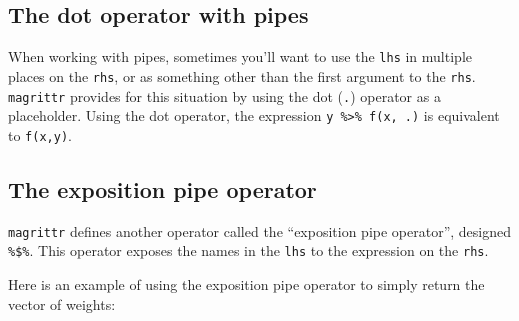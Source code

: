 \documentclass[]{book}
\newenvironment{Shaded}{\begin{snugshade}}{\end{snugshade}}
\newcommand{\CommentTok}[1]{\textcolor[rgb]{0.56,0.35,0.01}{\textit{#1}}}
\newcommand{\DecValTok}[1]{\textcolor[rgb]{0.00,0.00,0.81}{#1}}
\newcommand{\KeywordTok}[1]{\textcolor[rgb]{0.13,0.29,0.53}{\textbf{#1}}}
\newcommand{\NormalTok}[1]{#1}
\newcommand{\OperatorTok}[1]{\textcolor[rgb]{0.81,0.36,0.00}{\textbf{#1}}}
\newcommand{\StringTok}[1]{\textcolor[rgb]{0.31,0.60,0.02}{#1}}
\theoremstyle{definition}
\theoremstyle{definition}
\theoremstyle{definition}
\theoremstyle{remark}
\begin{document}
\hypertarget{the-dot-operator-with-pipes}{%
\subsection{The dot operator with
pipes}\label{the-dot-operator-with-pipes}}

When working with pipes, sometimes you'll want to use the \texttt{lhs}
in multiple places on the \texttt{rhs}, or as something other than the
first argument to the \texttt{rhs}. \texttt{magrittr} provides for this
situation by using the dot (\texttt{.}) operator as a placeholder. Using
the dot operator, the expression
\texttt{y\ \%\textgreater{}\%\ f(x,\ .)} is equivalent to
\texttt{f(x,y)}.

\begin{Shaded}
\end{Shaded}

\hypertarget{the-exposition-pipe-operator}{%
\subsection{The exposition pipe
operator}\label{the-exposition-pipe-operator}}

\texttt{magrittr} defines another operator called the ``exposition pipe
operator'', designed \texttt{\%\$\%}. This operator exposes the names in
the \texttt{lhs} to the expression on the \texttt{rhs}.

Here is an example of using the exposition pipe operator to simply
return the vector of weights:

\begin{Shaded}
\end{Shaded}
\end{document}
